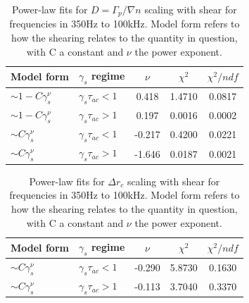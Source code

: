 \documentclass[aip,pop,amsmath,amssymb,reprint,superscriptaddress]{revtex4-1} %
\begin{document}
\begin{table}
\caption{\label{tab:table5}Power-law fits for $D = \Gamma_{p}/\nabla{n}$ scaling with shear for frequencies in 350Hz to 100kHz. Model form refers to how the shearing relates to the quantity in question, with C a constant and $\nu$ the power exponent.}
\begin{ruledtabular}
\begin{tabular}{llccc}
Model form&$\gamma_{s}$ regime&$\nu$&$\chi^2$&$\chi^2/ndf$\\
\hline
$\sim 1-C\gamma_{s}^\nu$&$\gamma_{s}\tau_{ac}<1$ &0.418   &1.4710    &0.0817\\
$\sim 1-C\gamma_{s}^\nu$&$\gamma_{s}\tau_{ac}>1$ &0.197   &0.0016    &0.0002\\
$\sim C\gamma_{s}^\nu$&$\gamma_{s}\tau_{ac}<1$   &-0.217  &0.4200    &0.0221\\
$\sim C\gamma_{s}^\nu$&$\gamma_{s}\tau_{ac}>1$   &-1.646  &0.0187    &0.0021\\
\end{tabular}
\end{ruledtabular}
\end{table}

\begin{table}
\caption{\label{tab:table6}Power-law fits for $\Delta r_{c}$ scaling with shear for frequencies in 350Hz to 100kHz. Model form refers to how the shearing relates to the quantity in question, with C a constant and $\nu$ the power exponent.}
\begin{ruledtabular}
\begin{tabular}{llccc}
Model form&$\gamma_{s}$ regime&$\nu$&$\chi^2$&$\chi^2/ndf$\\
\hline
$\sim C\gamma_{s}^\nu$&$\gamma_{s}\tau_{ac}<1$ &-0.290 &5.8730 &0.1630\\
$\sim C\gamma_{s}^\nu$&$\gamma_{s}\tau_{ac}>1$ &-0.113 &3.7040 &0.3370\\
\end{tabular}
\end{ruledtabular}
\end{table}
\end{document}
